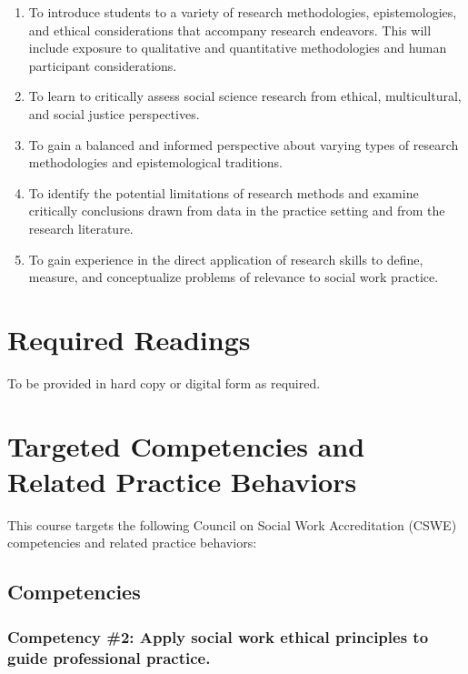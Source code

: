 \documentclass[11pt,]{article}
\providecommand{\tightlist}{%
  \setlength{\itemsep}{0pt}\setlength{\parskip}{0pt}}
\begin{document}
\begin{enumerate}
\def\labelenumi{\arabic{enumi}.}
\tightlist
\item
  To introduce students to a variety of research methodologies,
  epistemologies, and ethical considerations that accompany research
  endeavors. This will include exposure to qualitative and quantitative
  methodologies and human participant considerations.
\item
  To learn to critically assess social science research from ethical,
  multicultural, and social justice perspectives.
\item
  To gain a balanced and informed perspective about varying types of
  research methodologies and epistemological traditions.
\item
  To identify the potential limitations of research methods and examine
  critically conclusions drawn from data in the practice setting and
  from the research literature.
\item
  To gain experience in the direct application of research skills to
  define, measure, and conceptualize problems of relevance to social
  work practice.
\end{enumerate}

\section{Required Readings}\label{required-readings}

To be provided in hard copy or digital form as required.

\section{Targeted Competencies and Related Practice
Behaviors}\label{targeted-competencies-and-related-practice-behaviors}

This course targets the following Council on Social Work Accreditation
(CSWE) competencies and related practice behaviors:

\subsection{Competencies}\label{competencies}

\subsubsection{Competency \#2: Apply social work ethical principles to
guide professional
practice.}\label{competency-2-apply-social-work-ethical-principles-to-guide-professional-practice.}
\end{document}
